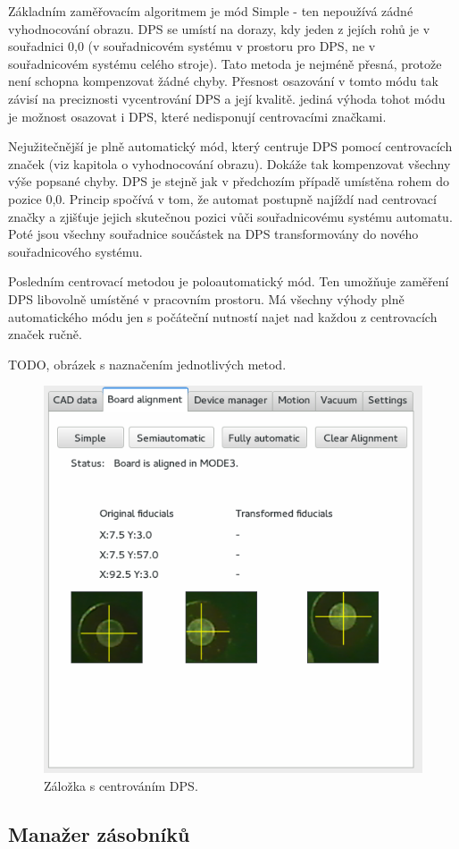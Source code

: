 Základním zaměřovacím algoritmem je mód Simple - ten nepoužívá zádné vyhodnocování obrazu. DPS se umístí na dorazy, kdy jeden z jejích rohů je v souřadnici 0,0 (v souřadnicovém systému v prostoru pro DPS, ne v souřadnicovém systému celého stroje). Tato metoda je nejméně přesná, protože není schopna kompenzovat žádné chyby. Přesnost osazování v tomto módu tak závisí na preciznosti vycentrování DPS a její kvalitě.
jediná výhoda tohot módu je možnost osazovat i DPS, které nedisponují centrovacími značkami.

Nejužitečnější je plně automatický mód, který centruje DPS pomocí centrovacích značek (viz kapitola o vyhodnocování obrazu). Dokáže tak kompenzovat všechny výše popsané chyby. DPS je stejně jak v předchozím případě umístěna rohem do pozice 0,0. Princip spočívá v tom, že automat postupně najíždí nad centrovací značky a zjišťuje jejich skutečnou pozici vůči souřadnicovému systému automatu. Poté jsou všechny souřadnice součástek na DPS transformovány do nového souřadnicového systému. 

Posledním centrovací metodou je poloautomatický mód. Ten umožňuje zaměření DPS libovolně umístěné v pracovním prostoru. Má všechny výhody plně automatického módu jen s počáteční nutností najet nad každou z centrovacích značek ručně.

TODO, obrázek s naznačením jednotlivých metod.


\begin{figure}[h!]
  \centering
    \includegraphics[width=0.6\linewidth]{obrazky/sw4.png}%
    \caption{Záložka s centrováním DPS.}
\end{figure}

\subsection{Manažer zásobníků}

